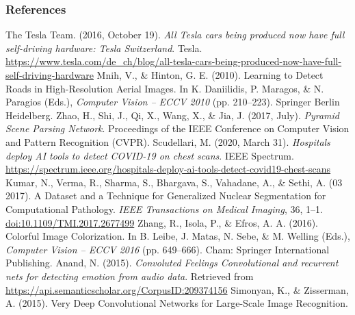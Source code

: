 \begin{vbframe}
\frametitle{References}
\footnotesize{
\begin{thebibliography}{99}
 The Tesla Team. (2016, October 19). \textit{All Tesla cars being produced now have full self-driving hardware: Tesla Switzerland}. Tesla. \url{https://www.tesla.com/de_ch/blog/all-tesla-cars-being-produced-now-have-full-self-driving-hardware}
 Mnih, V., \& Hinton, G. E. (2010). Learning to Detect Roads in High-Resolution Aerial Images. In K. Daniilidis, P. Maragos, \& N. Paragios (Eds.), \textit{Computer Vision – ECCV 2010} (pp. 210–223). Springer Berlin Heidelberg.
 Zhao, H., Shi, J., Qi, X., Wang, X., \& Jia, J. (2017, July). \textit{Pyramid Scene Parsing Network}. Proceedings of the IEEE Conference on Computer Vision and Pattern Recognition (CVPR).
 Scudellari, M. (2020, March 31). \textit{Hospitals deploy AI tools to detect COVID-19 on chest scans}. IEEE Spectrum.  \url{https://spectrum.ieee.org/hospitals-deploy-ai-tools-detect-covid19-chest-scans}
Kumar, N., Verma, R., Sharma, S., Bhargava, S., Vahadane, A., \& Sethi, A. (03 2017). A Dataset and a Technique for Generalized Nuclear Segmentation for Computational Pathology. \textit{IEEE Transactions on Medical Imaging}, 36, 1–1. \url{doi:10.1109/TMI.2017.2677499}
 Zhang, R., Isola, P., \& Efros, A. A. (2016). Colorful Image Colorization. In B. Leibe, J. Matas, N. Sebe, \& M. Welling (Eds.), \textit{Computer Vision -- ECCV 2016} (pp. 649–666). Cham: Springer International Publishing.
 Anand, N. (2015). \textit{Convoluted Feelings Convolutional and recurrent nets for detecting emotion from audio data}. Retrieved from \url{https://api.semanticscholar.org/CorpusID:209374156}
 Simonyan, K., \& Zisserman, A. (2015). Very Deep Convolutional Networks for Large-Scale Image Recognition.
\end{thebibliography}
}
\end{vbframe}

\endlecture
